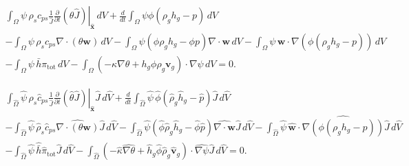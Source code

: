 \documentclass[11pt]{article}
\begin{document}
\begin{multline}
\int_{\Omega}
\psi\,\rho_{s} c_{ps} \frac{1}{\widehat{J}} \left. \frac{\partial}{\partial t} \left( \theta \widehat{J} \right)\right|_{\widehat{\mathbf{x}}} \,dV
+ \frac{d}{dt} \int_{\Omega}
\psi \phi(\rho_g h_g - p) \,dV
\\
- \int_{\Omega}
\psi\,\rho_{s} c_{ps} \nabla \cdot \left( \theta \mathbf{w} \right)\,dV
- \int_{\Omega} \psi \left( \phi \rho_{g} h_{g} - \phi p \right) \nabla \cdot \mathbf{w} \,dV
- \int_{\Omega}
\psi\,\mathbf{w}\cdot\nabla\left( \phi(\rho_g h_g - p) \right)\,dV
\\
- \int_{\Omega}
\psi\,\bar{h} \pi_{\mathrm{tot}}\,dV
- \int_{\Omega}
\left(
 -\kappa\nabla \theta + h_g \phi \rho_{g} \mathbf{v}_{g}
\right) \cdot \nabla \psi \,dV
= 0.
\end{multline}

\begin{multline}
\int_{\widehat{\Omega}}
\widehat{\psi}\,\widehat{\rho}_{s} \widehat{c}_{ps} \frac{1}{\widehat{J}} \left. \frac{\partial}{\partial t} \left( \widehat{\theta} \widehat{J} \right)\right|_{\widehat{\mathbf{x}}} \widehat{J}\,d\widehat{V}
+ \frac{d}{dt} \int_{\widehat{\Omega}}
\widehat{\psi}\,\widehat{\phi}(\widehat{\rho}_g \widehat{h}_g - \widehat{p}) \widehat{J}\,d\widehat{V}
\\
- \int_{\widehat{\Omega}}
\widehat{\psi}\,\widehat{\rho}_{s} \widehat{c}_{ps} \widehat{\nabla \cdot \left( \theta \mathbf{w} \right)} \widehat{J}\,d\widehat{V}
- \int_{\widehat{\Omega}} \widehat{\psi} \left( \widehat{\phi} \widehat{\rho}_g \widehat{h}_g - \widehat{\phi} \widehat{p} \right) \widehat{\nabla \cdot \mathbf{w}} \widehat{J}\,d\widehat{V}
- \int_{\widehat{\Omega}}
\widehat{\psi}\,\widehat{\mathbf{w}} \cdot \widehat{\nabla\left( \phi(\rho_g h_g - p) \right)} \widehat{J}\,d\widehat{V}
\\
- \int_{\widehat{\Omega}}
\widehat{\psi}\,\widehat{\bar{h}} \widehat{\pi}_{\mathrm{tot}}\widehat{J}\,d\widehat{V}
- \int_{\widehat{\Omega}}
\left(
 -\widehat{\kappa}\widehat{\nabla \theta} + \widehat{h}_g \widehat{\phi} \widehat{\rho}_g \widehat{\mathbf{v}}_g
 \right) \cdot \widehat{\nabla \psi} \widehat{J}\,d\widehat{V}
= 0.
\end{multline}
\end{document}
